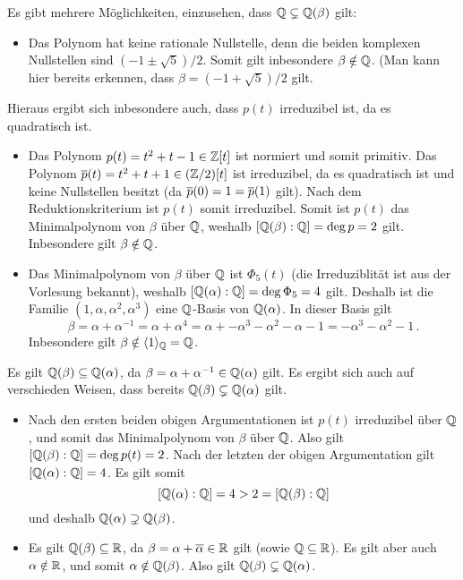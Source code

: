 Es gibt mehrere Möglichkeiten, einzusehen, dass $\mathbb{Q} \subsetneq \mathbb{Q}(\beta)$ gilt:
\begin{itemize}
  \item
    Das Polynom hat keine rationale Nullstelle, denn die beiden komplexen Nullstellen sind $(-1 \pm \sqrt{5})/2$.
    Somit gilt inbesondere $\beta \notin \mathbb{Q}$.
    (Man kann hier bereits erkennen, dass $\beta = (-1 + \sqrt{5})/2$ gilt.
\end{itemize}
Hieraus ergibt sich inbesondere auch, dass $p(t)$ irreduzibel ist, da es quadratisch ist.
\begin{itemize}[resume]
  \item
    Das Polynom $p(t) = t^2 + t -1 \in \mathbb{Z}[t]$ ist normiert und somit primitiv.
    Das Polynom $\overline{p}(t) = t^2 + t + 1 \in (\mathbb{Z}/2)[t]$ ist irreduzibel, da es quadratisch ist und keine Nullstellen besitzt (da $\overline{p}(0) = 1 = \overline{p}(1)$ gilt).
    Nach dem Reduktionskriterium ist $p(t)$ somit irreduzibel.
    Somit ist $p(t)$ das Minimalpolynom von $\beta$ über $\mathbb{Q}$, weshalb $[\mathbb{Q}(\beta) : \mathbb{Q}] = \deg p = 2$ gilt.
    Inbesondere gilt $\beta \notin \mathbb{Q}$.
  \item
    Das Minimalpolynom von $\beta$ über $\mathbb{Q}$ ist $\Phi_5(t)$ (die Irreduziblität ist aus der Vorlesung bekannt), weshalb $[\mathbb{Q}(\alpha) : \mathbb{Q}] = \deg \Phi_5 = 4$ gilt.
    Deshalb ist die Familie $(1, \alpha, \alpha^2, \alpha^3)$ eine $\mathbb{Q}$-Basis von $\mathbb{Q}(\alpha)$.
    In dieser Basis gilt
    \[
        \beta
      = \alpha + \alpha^{-1}
      = \alpha + \alpha^4
      = \alpha + -\alpha^3 - \alpha^2 - \alpha - 1
      = -\alpha^3 - \alpha^2 - 1 \,.
    \]
    Inbesondere gilt $\beta \notin \langle 1 \rangle_{\mathbb{Q}} = \mathbb{Q}$.
\end{itemize}

Es gilt $\mathbb{Q}(\beta) \subseteq \mathbb{Q}(\alpha)$, da $\beta = \alpha + \alpha^{-1} \in \mathbb{Q}(\alpha)$ gilt.
Es ergibt sich auch auf verschieden Weisen, dass bereits $\mathbb{Q}(\beta) \subsetneq \mathbb{Q}(\alpha)$ gilt.
\begin{itemize}
  \item
    Nach den ersten beiden obigen Argumentationen ist $p(t)$ irreduzibel über $\mathbb{Q}$, und somit das Minimalpolynom von $\beta$ über $\mathbb{Q}$.
    Also gilt $[\mathbb{Q}(\beta) : \mathbb{Q}] = \deg p(t) = 2$.
    Nach der letzten der obigen Argumentation gilt $[\mathbb{Q}(\alpha) : \mathbb{Q}] = 4$.
    Es gilt somit
    \[
        [\mathbb{Q}(\alpha) : \mathbb{Q}]
      = 4
      > 2
      = [\mathbb{Q}(\beta) : \mathbb{Q}]
    \]
    und deshalb $\mathbb{Q}(\alpha) \supsetneq \mathbb{Q}(\beta)$.
  \item
    Es gilt $\mathbb{Q}(\beta) \subseteq \mathbb{R}$, da $\beta = \alpha + \overline{\alpha} \in \mathbb{R}$ gilt (sowie $\mathbb{Q} \subseteq \mathbb{R}$).
    Es gilt aber auch $\alpha \notin \mathbb{R}$, und somit $\alpha \notin \mathbb{Q}(\beta)$.
    Also gilt $\mathbb{Q}(\beta) \subsetneq \mathbb{Q}(\alpha)$.
\end{itemize}

